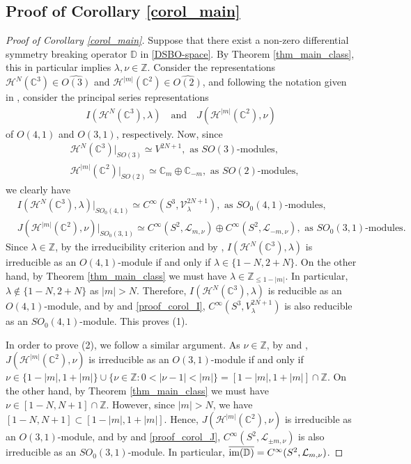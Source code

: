 \documentclass[12pt, pdflatex, a4paper]{article}
\theoremstyle{plain}
\theoremstyle{definition}
\def\C{{\mathbb C}}
\def\D{\mathbb{D}}
\def\Harm{\mathcal{H}}
\def\im{\text{\normalfont{im}}}
\def\L{\mathcal{L}}
\def\V{\mathcal{V}}
\def\Z{{\mathbb Z}}
\begin{document}
\subsection{Proof of Corollary \ref{corol_main}}\label{section-proof-corol}
\begin{proof}[Proof of Corollary \ref{corol_main}] Suppose that there exist a non-zero differential symmetry breaking operator $\D$ in \eqref{DSBO-space}. By Theorem \ref{thm_main_class}, this in particular implies $\lambda, \nu \in \Z$.
Consider the representations $\Harm^N(\C^3) \in \widehat{O(3)}$ and $\Harm^{|m|}(\C^2) \in \widehat{O(2)}$, and following the notation given in \cite[Sec. 2.3]{KS18}, consider the principal series representations
\begin{align*}
I(\Harm^N(\C^3),\lambda) \quad \text{and} \quad J(\Harm^{|m|}(\C^2),\nu)
\end{align*}
of $O(4,1)$ and $O(3,1)$, respectively. Now, since
\begin{align*}
&\Harm^N(\C^3)\big\rvert_{SO(3)} \simeq V^{2N+1}, \text{ as } SO(3)\text{-modules},\\
&\Harm^{|m|}(\C^2)\big\rvert_{SO(2)} \simeq \C_{m} \oplus \C_{-m}, \text{ as } SO(2)\text{-modules},
\end{align*}
we clearly have
\begin{align}
\label{proof_corol_I}
&I(\Harm^N(\C^3),\lambda)\big\rvert_{SO_0(4,1)} \simeq C^\infty(S^3, \V_\lambda^{2N+1}), \text{ as } SO_0(4,1)\text{-modules},\\
\label{proof_corol_J}
&J(\Harm^{|m|}(\C^2),\nu)\big\rvert_{SO_0(3,1)} \simeq C^\infty(S^2, \L_{m,\nu}) \oplus C^\infty(S^2, \L_{-m,\nu}) , \text{ as } SO_0(3,1)\text{-modules}.
\end{align}
Since $\lambda \in \Z$, by the irreducibility criterion \cite[Thm. 14.15]{KS18} and by \cite[Ex. 2.8]{KS18}, $I(\Harm^N(\C^3),\lambda)$ is irreducible as an $O(4,1)$-module if and only if $\lambda \in \{1-N, 2+N\}$. On the other hand, by Theorem \ref{thm_main_class} we must have $\lambda \in \Z_{\leq 1-|m|}$. In particular, $\lambda \not\in \{1-N, 2+N\}$ as $|m| > N$. Therefore, $I(\Harm^N(\C^3),\lambda)$ is reducible as an $O(4,1)$-module, and by \cite[Lem. 15.3]{KS18} and \eqref{proof_corol_I}, $C^\infty(S^3, V_\lambda^{2N+1})$ is also reducible as an $SO_0(4,1)$-module. This proves (1).

In order to prove (2), we follow a similar argument. As $\nu \in \Z$, by \cite[Thm. 14.15]{KS18} and \cite[Ex. 2.8]{KS18}, $J(\Harm^{|m|}(\C^2),\nu)$ is irreducible as an $O(3,1)$-module if and only if $\nu \in \{1-|m|, 1+|m|\}\cup\{\nu \in \Z: 0<|\nu-1| < |m|\} = [1-|m|, 1+|m|]\cap \Z$. On the other hand, by Theorem \ref{thm_main_class} we must have $\nu \in [1-N, N+1]\cap \Z$. However, since $|m| > N$, we have $[1-N, N+1]\subset [1-|m|, 1+|m|]$. Hence, $J(\Harm^{|m|}(\C^2),\nu)$ is irreducible as an $O(3,1)$-module, and by \cite[Lem. 15.3]{KS18} and \eqref{proof_corol_J}, $C^\infty(S^2, \L_{\pm m,\nu})$ is also irreducible as an $SO_0(3,1)$-module. In particular, $\overline{\im(\D)} = C^\infty(S^2, \L_{m,\nu})$.
\end{proof}
\end{document}
